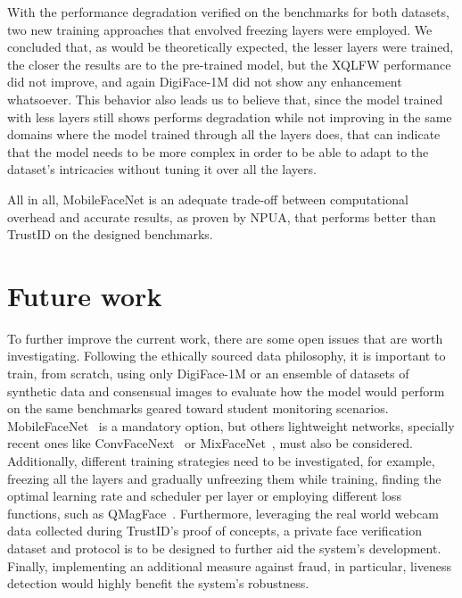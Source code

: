 \documentclass[class=report, crop=false, a4paper, 12pt]{standalone}
\begin{document}
\par With the performance degradation verified on the benchmarks for both datasets, two new training approaches that envolved freezing layers were employed. We concluded that, as would be theoretically expected, the lesser layers were trained, the closer the results are to the pre-trained model, but the XQLFW performance did not improve, and again DigiFace-1M did not show any enhancement whatsoever. This behavior also leads us to believe that, since the model trained with less layers still shows performs degradation while not improving in the same domains where the model trained through all the layers does, that can indicate that the model needs to be more complex in order to be able to adapt to the dataset's intricacies without tuning it over all the layers.

\par All in all, MobileFaceNet is an adequate trade-off between computational overhead and accurate results, as proven by NPUA, that performs better than TrustID on the designed benchmarks. 

\section{Future work}
To further improve the current work, there are some open issues that are worth investigating. Following the ethically sourced data philosophy, it is important to train, from scratch, using only DigiFace-1M or an ensemble of datasets of synthetic data and consensual images to evaluate how the model would perform on the same benchmarks geared toward student monitoring scenarios. MobileFaceNet~\autocite{chenMobileFaceNetsEfficientCNNs2018} is a mandatory option, but others lightweight networks, specially recent ones like ConvFaceNext~\autocite{hooConvFaceNeXtLightweightNetworks2022} or MixFaceNet~\autocite{boutrosMixFaceNetsExtremelyEfficient2021}, must also be considered. Additionally, different training strategies need to be investigated, for example, freezing all the layers and gradually unfreezing them while training, finding the optimal learning rate and scheduler per layer or employing different loss functions, such as QMagFace~\autocite{terhorstQMagFaceSimpleAccurate2023}. Furthermore, leveraging the real world webcam data collected during TrustID's proof of concepts, a private face verification dataset and protocol is to be designed to further aid the system's development. Finally, implementing an additional measure against fraud, in particular, liveness detection would highly benefit the system's robustness. 
\end{document}
